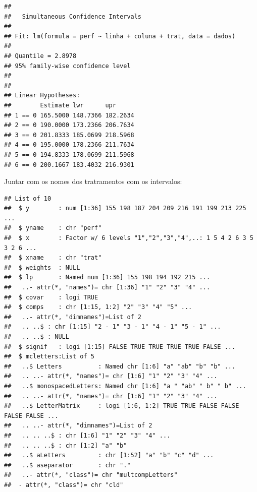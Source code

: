 \documentclass[
]{book}
\newenvironment{Shaded}{\begin{snugshade}}{\end{snugshade}}
\newcommand{\KeywordTok}[1]{\textcolor[rgb]{0.13,0.29,0.53}{\textbf{#1}}}
\newcommand{\NormalTok}[1]{#1}
\newcommand{\OperatorTok}[1]{\textcolor[rgb]{0.81,0.36,0.00}{\textbf{#1}}}
\newcommand{\StringTok}[1]{\textcolor[rgb]{0.31,0.60,0.02}{#1}}
\begin{document}
\begin{verbatim}
## 
##   Simultaneous Confidence Intervals
## 
## Fit: lm(formula = perf ~ linha + coluna + trat, data = dados)
## 
## Quantile = 2.8978
## 95% family-wise confidence level
##  
## 
## Linear Hypotheses:
##        Estimate lwr      upr     
## 1 == 0 165.5000 148.7366 182.2634
## 2 == 0 190.0000 173.2366 206.7634
## 3 == 0 201.8333 185.0699 218.5968
## 4 == 0 195.0000 178.2366 211.7634
## 5 == 0 194.8333 178.0699 211.5968
## 6 == 0 200.1667 183.4032 216.9301
\end{verbatim}

Juntar com os nomes dos tratramentos com os intervalos:

\begin{Shaded}
\end{Shaded}

\begin{verbatim}
## List of 10
##  $ y        : num [1:36] 155 198 187 204 209 216 191 199 213 225 ...
##  $ yname    : chr "perf"
##  $ x        : Factor w/ 6 levels "1","2","3","4",..: 1 5 4 2 6 3 5 3 2 6 ...
##  $ xname    : chr "trat"
##  $ weights  : NULL
##  $ lp       : Named num [1:36] 155 198 194 192 215 ...
##   ..- attr(*, "names")= chr [1:36] "1" "2" "3" "4" ...
##  $ covar    : logi TRUE
##  $ comps    : chr [1:15, 1:2] "2" "3" "4" "5" ...
##   ..- attr(*, "dimnames")=List of 2
##   .. ..$ : chr [1:15] "2 - 1" "3 - 1" "4 - 1" "5 - 1" ...
##   .. ..$ : NULL
##  $ signif   : logi [1:15] FALSE TRUE TRUE TRUE TRUE FALSE ...
##  $ mcletters:List of 5
##   ..$ Letters          : Named chr [1:6] "a" "ab" "b" "b" ...
##   .. ..- attr(*, "names")= chr [1:6] "1" "2" "3" "4" ...
##   ..$ monospacedLetters: Named chr [1:6] "a " "ab" " b" " b" ...
##   .. ..- attr(*, "names")= chr [1:6] "1" "2" "3" "4" ...
##   ..$ LetterMatrix     : logi [1:6, 1:2] TRUE TRUE FALSE FALSE FALSE FALSE ...
##   .. ..- attr(*, "dimnames")=List of 2
##   .. .. ..$ : chr [1:6] "1" "2" "3" "4" ...
##   .. .. ..$ : chr [1:2] "a" "b"
##   ..$ aLetters         : chr [1:52] "a" "b" "c" "d" ...
##   ..$ aseparator       : chr "."
##   ..- attr(*, "class")= chr "multcompLetters"
##  - attr(*, "class")= chr "cld"
\end{verbatim}
\end{document}
